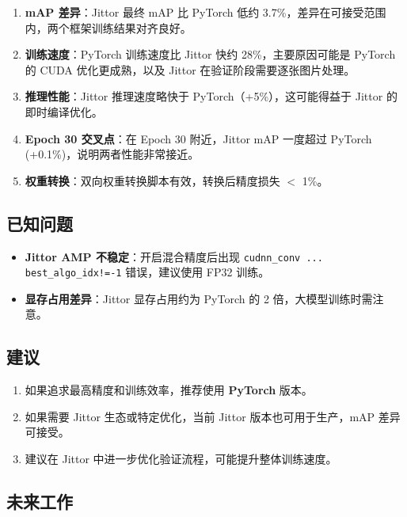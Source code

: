 \documentclass[12pt,a4paper]{article}
\begin{document}
\begin{enumerate}
    \item \textbf{mAP 差异}：Jittor 最终 mAP 比 PyTorch 低约 3.7\%，差异在可接受范围内，两个框架训练结果对齐良好。

    \item \textbf{训练速度}：PyTorch 训练速度比 Jittor 快约 28\%，主要原因可能是 PyTorch 的 CUDA 优化更成熟，以及 Jittor 在验证阶段需要逐张图片处理。

    \item \textbf{推理性能}：Jittor 推理速度略快于 PyTorch（+5\%），这可能得益于 Jittor 的即时编译优化。

    \item \textbf{Epoch 30 交叉点}：在 Epoch 30 附近，Jittor mAP 一度超过 PyTorch (+0.1\%)，说明两者性能非常接近。

    \item \textbf{权重转换}：双向权重转换脚本有效，转换后精度损失 $<$ 1\%。
\end{enumerate}

\subsection{已知问题}

\begin{itemize}
    \item \textbf{Jittor AMP 不稳定}：开启混合精度后出现 \texttt{cudnn\_conv ... best\_algo\_idx!=-1} 错误，建议使用 FP32 训练。
    \item \textbf{显存占用差异}：Jittor 显存占用约为 PyTorch 的 2 倍，大模型训练时需注意。
\end{itemize}

\subsection{建议}

\begin{enumerate}
    \item 如果追求最高精度和训练效率，推荐使用 \textbf{PyTorch} 版本。
    \item 如果需要 Jittor 生态或特定优化，当前 Jittor 版本也可用于生产，mAP 差异可接受。
    \item 建议在 Jittor 中进一步优化验证流程，可能提升整体训练速度。
\end{enumerate}

\subsection{未来工作}
\end{document}
